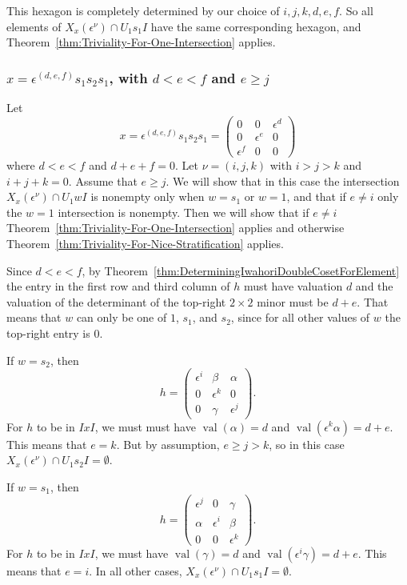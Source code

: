 \documentclass{amsart}
\theoremstyle{definition}
\def\e{\epsilon}
\def\val{\mathop{\mathrm{val}}}
\def\en{\e^{\nu}}
\def\X{X_x(\en)}
\begin{document}
  This hexagon is completely determined by our choice of $i,j,k,d,e,f$.  So all
  elements of $\X \cap U_1 s_1 I$ have the same corresponding hexagon, and
  Theorem~\ref{thm:Triviality-For-One-Intersection} applies.

  \subsubsection{$x = \e^{(d,e,f)} s_1s_2s_1$, with $d < e < f$ and $e \ge j$}
  \label{sec:first-long-two-cycle}
  Let
  \begin{equation}
    x = \e^{(d, e, f)}s_1s_2s_1 = \begin{pmatrix}
        0 & 0 & \e^d  \\
        0 & \e^e & 0 \\
         \e^f & 0 & 0
      \end{pmatrix}
  \end{equation}
  where $d < e < f$ and $d + e + f = 0$.  Let $\nu = (i,j,k)$ with $i > j > k$
  and $i + j + k = 0$.  Assume that $e \ge j$.  We will show that in this case
  the intersection $\X \cap U_1wI$ is nonempty only when $w = s_1$ or $w = 1$,
  and that if $e \neq i$ only the $w = 1$ intersection is nonempty.  Then we
  will show that if $e \neq i$
  Theorem~\ref{thm:Triviality-For-One-Intersection} applies and otherwise
  Theorem~\ref{thm:Triviality-For-Nice-Stratification} applies.
  
  Since $d < e < f$, by
  Theorem~\ref{thm:DeterminingIwahoriDoubleCosetForElement} the entry in the
  first row and third column of $h$ must have valuation $d$ and the valuation
  of the determinant of the top-right $2 \times 2$ minor must be $d + e$.  That
  means that $w$ can only be one of $1$, $s_1$, and $s_2$, since for all other
  values of $w$ the top-right entry is 0.

  If $w = s_2$, then
  \begin{equation*}
    h = \begin{pmatrix}
      \e^i & \beta & \alpha \\
      0 & \e^k & 0 \\
      0 & \gamma & \e^j
    \end{pmatrix}.
  \end{equation*}
  For $h$ to be in $IxI$, we must must have $\val(\alpha) = d$ and
  $\val(\e^k\alpha) = d + e$.  This means that $e = k$.  But by assumption, $e
  \ge j > k$, so in this case $\X \cap U_1 s_2 I = \emptyset$.

  If $w = s_1$, then
  \begin{equation*}
    h = \begin{pmatrix}
      \e^j & 0 & \gamma \\
      \alpha & \e^i & \beta \\
      0 & 0 & \e^k
    \end{pmatrix}.
  \end{equation*}
  For $h$ to be in $IxI$, we must have $\val(\gamma) = d$ and $\val(\e^i\gamma)
  = d + e$.  This means that $e = i$.  In all other cases, $\X \cap U_1 s_1 I =
  \emptyset$.
\end{document}
